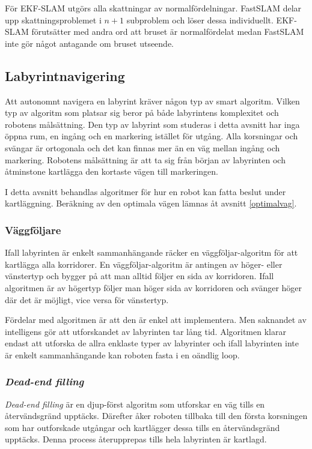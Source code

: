 \documentclass[11pt]{article}
\begin{document}
\begin{flushleft}
För EKF-SLAM utgörs alla skattningar av normalfördelningar. FastSLAM delar upp skattningsproblemet i $n + 1$ subproblem och löser dessa individuellt. EKF-SLAM förutsätter med andra ord att bruset är normalfördelat medan FastSLAM inte gör något antagande om bruset utseende.

\subsection{Labyrintnavigering}
Att autonomnt navigera en labyrint kräver någon typ av smart algoritm. Vilken typ av algoritm som platsar sig beror på både labyrintens komplexitet och robotens målsättning. Den typ av labyrint som studeras i detta avsnitt har inga öppna rum, en ingång och en markering istället för utgång. Alla korsningar och svängar är ortogonala och det kan finnas mer än en väg mellan ingång och markering. Robotens målsättning är att ta sig från början av labyrinten och åtminstone kartlägga den kortaste vägen till markeringen.

I detta avsnitt behandlas algoritmer för hur en robot kan fatta beslut under kartläggning. Beräkning av den optimala vägen lämnas åt avsnitt \ref{optimalvag}.

\subsubsection{Väggföljare}
Ifall labyrinten är enkelt sammanhängande räcker en väggföljar-algoritm för att kartlägga alla korridorer. En väggföljar-algoritm är antingen av höger- eller vänstertyp och bygger på att man alltid följer en sida av korridoren. Ifall algoritmen är av högertyp följer man höger sida av korridoren och svänger höger där det är möjligt, vice versa för vänstertyp.

Fördelar med algoritmen är att den är enkel att implementera. Men saknandet av intelligens gör att utforskandet av labyrinten tar lång tid. Algoritmen klarar endast att utforska de allra enklaste typer av labyrinter och ifall labyrinten inte är enkelt sammanhängande kan roboten fasta i en oändlig loop.

\subsubsection{\emph{Dead-end filling}}
\emph{Dead-end filling} är en djup-först algoritm som utforskar en väg tills en återvändsgränd upptäcks. Därefter åker roboten tillbaka till den första korsningen som har outforskade utgångar och kartlägger dessa tills en återvändsgränd upptäcks. Denna process återupprepas tills hela labyrinten är kartlagd.


\end{flushleft}
\end{document}
